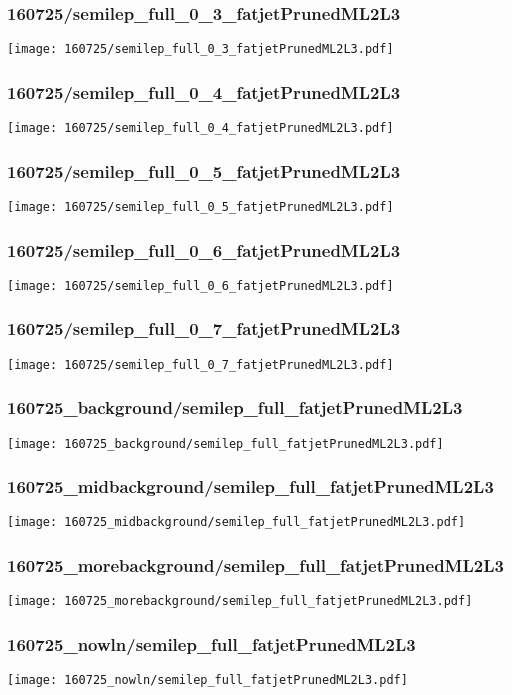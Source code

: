 \begin{frame}
   \frametitle{\small 160725/semilep\_full\_0\_3\_fatjetPrunedML2L3}
   \centering
   \texttt{[image: 160725/semilep\_full\_0\_3\_fatjetPrunedML2L3.pdf]}
\end{frame}

\begin{frame}
   \frametitle{\small 160725/semilep\_full\_0\_4\_fatjetPrunedML2L3}
   \centering
   \texttt{[image: 160725/semilep\_full\_0\_4\_fatjetPrunedML2L3.pdf]}
\end{frame}

\begin{frame}
   \frametitle{\small 160725/semilep\_full\_0\_5\_fatjetPrunedML2L3}
   \centering
   \texttt{[image: 160725/semilep\_full\_0\_5\_fatjetPrunedML2L3.pdf]}
\end{frame}

\begin{frame}
   \frametitle{\small 160725/semilep\_full\_0\_6\_fatjetPrunedML2L3}
   \centering
   \texttt{[image: 160725/semilep\_full\_0\_6\_fatjetPrunedML2L3.pdf]}
\end{frame}

\begin{frame}
   \frametitle{\small 160725/semilep\_full\_0\_7\_fatjetPrunedML2L3}
   \centering
   \texttt{[image: 160725/semilep\_full\_0\_7\_fatjetPrunedML2L3.pdf]}
\end{frame}

\begin{frame}
   \frametitle{\small 160725\_background/semilep\_full\_fatjetPrunedML2L3}
   \centering
   \texttt{[image: 160725\_background/semilep\_full\_fatjetPrunedML2L3.pdf]}
\end{frame}

\begin{frame}
   \frametitle{\small 160725\_midbackground/semilep\_full\_fatjetPrunedML2L3}
   \centering
   \texttt{[image: 160725\_midbackground/semilep\_full\_fatjetPrunedML2L3.pdf]}
\end{frame}

\begin{frame}
   \frametitle{\small 160725\_morebackground/semilep\_full\_fatjetPrunedML2L3}
   \centering
   \texttt{[image: 160725\_morebackground/semilep\_full\_fatjetPrunedML2L3.pdf]}
\end{frame}

\begin{frame}
   \frametitle{\small 160725\_nowln/semilep\_full\_fatjetPrunedML2L3}
   \centering
   \texttt{[image: 160725\_nowln/semilep\_full\_fatjetPrunedML2L3.pdf]}
\end{frame}

